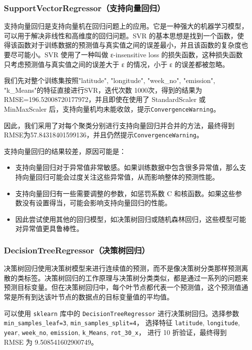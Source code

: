 \documentclass{ctexart}
\begin{document}
\subsubsection{SupportVectorRegressor（支持向量回归）}

支持向量回归是支持向量机在回归问题上的应用。它是一种强大的机器学习模型，可以用于解决非线性和高维度的回归问题。SVR 的基本思想是找到一个函数，使得该函数对于训练数据的预测值与真实值之间的误差最小，并且该函数的复杂度也要尽可能小。SVR 使用了一种叫做 ε-insensitive loss 的损失函数，这种损失函数只考虑预测值与真实值之间的误差大于 ε 的情况，小于 ε 的误差都被忽略。

我们先对整个训练集按照"latitude", "longitude", "week\_no", "emission", "k\_Means"的特征直接进行SVR，迭代次数 1000次，得到的结果为RMSE=196.52008720177972，并且即使在使用了 StandardScaler 或 MinMaxScaler 后，支持向量机均未能收敛，提示\texttt{ConvergenceWarning}。

因此，我们采用了对每个聚类分别进行支持向量回归并合并的方法，最终得到RMSE为57.84318401599136，并且仍然提示\texttt{ConvergenceWarning}。

支持向量回归的结果较差，原因可能是：

\begin{itemize}
      \item 支持向量回归对于异常值非常敏感。如果训练数据中包含很多异常值，那么支持向量回归可能会过度关注这些异常值，从而影响整体的预测性能。
      \item 支持向量回归有一些需要调整的参数，如惩罚系数 C 和核函数。如果这些参数没有设置得当，可能会影响支持向量回归的性能。
      \item 因此尝试使用其他的回归模型，如决策树回归或随机森林回归，这些模型可能对异常值更具鲁棒性。
\end{itemize}

\subsubsection{DecisionTreeRegressor（决策树回归）}

决策树回归使用决策树模型来进行连续值的预测，而不是像决策树分类那样预测离散的类标签。决策树回归的工作原理与决策树分类类似，都是通过一系列的问题来预测目标变量。但在决策树回归中，每个叶节点都代表一个预测值，这个预测值通常是所有到达该叶节点的数据点的目标变量值的平均值。

可以使用 \texttt{sklearn} 库中的 \texttt{DecisionTreeRegressor} 进行决策树回归。选择参数
\texttt{min\_samples\_leaf=3}, \texttt{min\_samples\_split=4}，
选择特征 \texttt{latitude}, \texttt{longitude}, \texttt{year}, \texttt{week\_no}, \texttt{emission}, \texttt{k\_Means}, \texttt{rot\_30\_x}，
进行 10 折验证，最终得到 RMSE 为 9.508541602900749。
\end{document}
